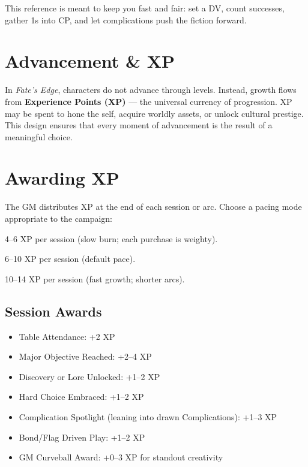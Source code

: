 \documentclass[12pt]{book}
\begin{document}
\bigskip
\noindent This reference is meant to keep you fast and fair: set a DV, count successes, gather 1s into CP, and let complications push the fiction forward.

\section{Advancement \& XP}

In \textit{Fate’s Edge}, characters do not advance through levels. 
Instead, growth flows from \textbf{Experience Points (XP)} --- the universal currency of progression. 
XP may be spent to hone the self, acquire worldly assets, or unlock cultural prestige. 
This design ensures that every moment of advancement is the result of a meaningful choice.

\section{Awarding XP}

The GM distributes XP at the end of each session or arc. 
Choose a pacing mode appropriate to the campaign:

\begin{description}[leftmargin=2cm]
  \item[Gritty:] 4--6 XP per session (slow burn; each purchase is weighty).  
  \item[Standard:] 6--10 XP per session (default pace).  
  \item[Heroic:] 10--14 XP per session (fast growth; shorter arcs).  
\end{description}

\subsection*{Session Awards}
\begin{itemize}
  \item Table Attendance: +2 XP  
  \item Major Objective Reached: +2--4 XP  
  \item Discovery or Lore Unlocked: +1--2 XP  
  \item Hard Choice Embraced: +1--2 XP  
  \item Complication Spotlight (leaning into drawn Complications): +1--3 XP  
  \item Bond/Flag Driven Play: +1--2 XP  
  \item GM Curveball Award: +0--3 XP for standout creativity  
\end{itemize}
\end{document}
